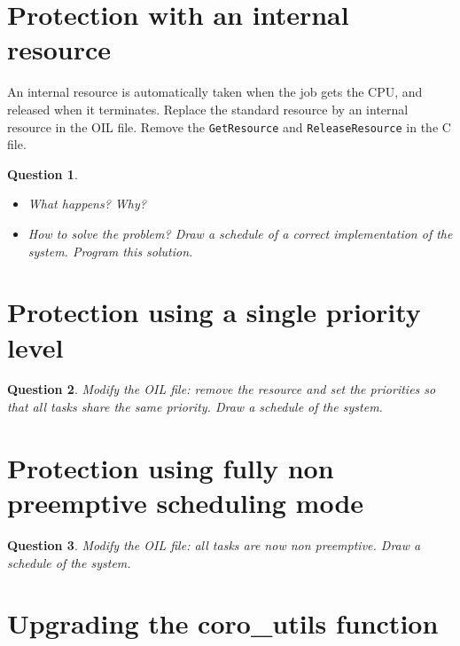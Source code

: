 \documentclass[11pt]{report}
\newtheorem{ex}{Question}
\begin{document}



\section{Protection with an internal resource}

An internal resource is automatically taken when the job gets the CPU, and released when it terminates. Replace the standard resource by an internal resource in the OIL file. Remove the \texttt{GetResource} and \texttt{ReleaseResource} in the C file.

\begin{ex}~
    \begin{itemize}
        \item
            What happens? Why?
        \item
            How to solve the problem? Draw a schedule of a correct implementation of the system. Program this solution.
    \end{itemize}
\end{ex}


\section{Protection using a single priority level}

\begin{ex}
Modify the OIL file: remove the resource and set the priorities so that all tasks share the same priority. Draw a schedule of the system.
\end{ex}

\section{Protection using fully non preemptive scheduling mode}

\begin{ex}
Modify the OIL file: all tasks are now non preemptive. Draw a schedule of the system.
\end{ex}


\section{Upgrading the coro\_utils function}
\end{document}
